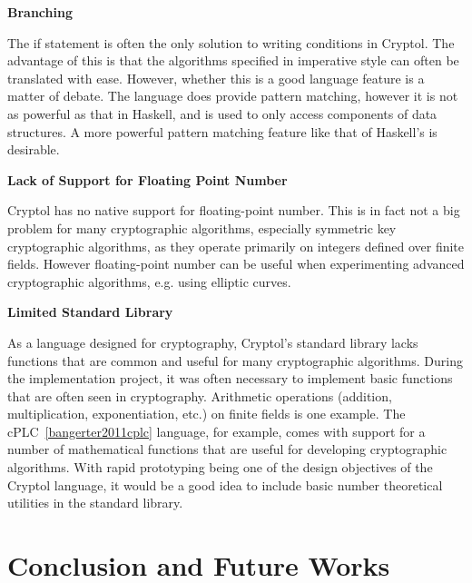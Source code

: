 \documentclass[a4paper, notitlepage]{report}
\renewcommand{\paragraph}[1]{\vspace*{1em}\noindent\textbf{#1}\hspace*{1em}}
\begin{document}
\paragraph{Branching}

The if statement is often the only solution to writing conditions in Cryptol. 
The advantage of this is that the
algorithms specified in imperative style can often be translated with ease. However,
whether this is a good language feature is a matter of debate. The language does
provide pattern matching, however it is not as powerful as that in Haskell, and is
used to only access components of data structures.
A more powerful pattern matching feature like that of Haskell's is desirable.

\paragraph{Lack of Support for Floating Point Number}

Cryptol has no native support for floating-point number. This is in fact not a big 
problem for many cryptographic algorithms, especially symmetric key cryptographic
algorithms, as they operate primarily on integers defined over finite fields. 
However floating-point number can be useful when experimenting advanced
cryptographic algorithms, e.g. using elliptic curves.

\paragraph{Limited Standard Library}

As a language designed for cryptography, Cryptol's standard library lacks functions 
that are common and useful for many cryptographic algorithms. 
During the implementation project, it was often necessary to implement basic functions
that are often seen in cryptography.
Arithmetic operations 
(addition, multiplication, exponentiation, etc.) on finite fields is one example. 
The cPLC~\ref{bangerter2011cplc} language, for example, comes with support for a number
 of mathematical functions that are useful for developing cryptographic algorithms.
With rapid prototyping being one of the design objectives of the Cryptol language, 
it would be a good idea to include basic number theoretical utilities in the 
standard library.

\newpage
\chapter{Conclusion and Future Works}
\end{document}
